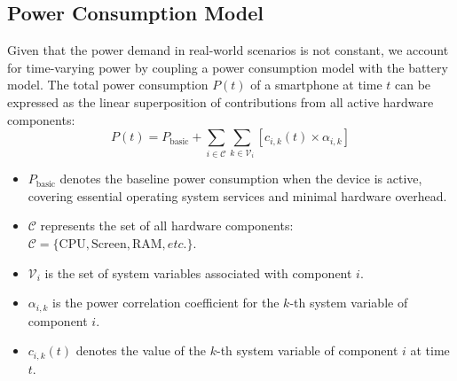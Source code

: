 \subsection{Power Consumption Model}
Given that the power demand in real-world scenarios is not constant, we account for time-varying power by coupling 
a power consumption model with the battery model. The total power consumption \(P(t)\) of a smartphone at time \(t\) 
can be expressed as the linear superposition of contributions from all active hardware components:
\begin{equation}
P(t) = P_{\text{basic}} + \sum_{i \in \mathcal{C}} \sum_{k \in \mathcal{V}_i} \left[ c_{i,k}(t) \times \alpha_{i,k} \right]
\label{eq:total_power}
\end{equation}

\begin{itemize}
    \item $P_{\text{basic}}$ denotes the baseline power consumption when the device is active, covering essential operating system services and minimal hardware overhead.

    \item $\mathcal{C}$ represents the set of all hardware components:
          $\mathcal{C} = \{\text{CPU}, \text{Screen}, \text{RAM}, etc.\}$.

    \item $\mathcal{V}_i$ is the set of system variables associated with component $i$.

    \item $\alpha_{i,k}$ is the power correlation coefficient for the $k$-th system variable of component $i$.

    \item $c_{i,k}(t)$ denotes the value of the $k$-th system variable of component $i$ at time $t$.
\end{itemize}

